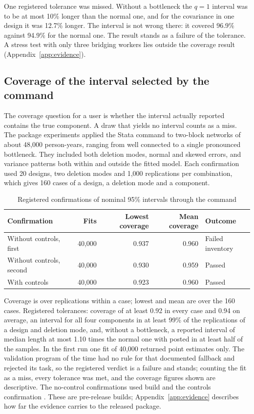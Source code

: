 One registered tolerance was missed. Without a bottleneck the $q=1$ interval was to be
at most 10\% longer than the normal one, and for the covariance in one design it was
12.7\% longer. The interval is not wrong there: it covered 96.9\% against 94.9\% for
the normal one. The result stands as a failure of the tolerance. A stress test with
only three bridging workers lies outside the coverage result
(Appendix~\ref{app:evidence}).

\subsection{Coverage of the interval selected by the command}\label{sec:impl-mc}
The coverage question for a user is whether the interval actually reported
contains the true component. A draw that yields no interval counts as a miss.
The package experiments applied the Stata command to two-block networks of
about 48,000 person-years, ranging from well connected to a single pronounced
bottleneck. They included both deletion modes, normal and skewed errors, and
variance patterns both within and outside the fitted model. Each confirmation
used 20 designs, two deletion modes and 1,000 replications per combination, which
gives 160 cases of a design, a deletion mode and a component.

\begin{table}[htbp]\centering
\caption{Registered confirmations of nominal 95\% intervals through the command}
\label{tab:impl-mc}
\begin{tabular}{@{}lrrrl@{}}
\toprule
Confirmation & Fits & Lowest coverage & Mean coverage & Outcome\\
\midrule
Without controls, first & 40,000 & 0.937 & 0.960 & Failed inventory\\
Without controls, second & 40,000 & 0.930 & 0.959 & Passed\\
With controls & 40,000 & 0.923 & 0.960 & Passed\\
\bottomrule
\end{tabular}
\par\smallskip\begin{minipage}{0.92\linewidth}\footnotesize
Coverage is over replications within a case; lowest and mean are over the 160 cases.
Registered tolerances: coverage of at least 0.92 in every case and 0.94 on average,
an interval for all four components in at least 99\% of the replications of a design
and deletion mode, and, without a bottleneck, a reported interval of median length at
most 1.10 times the normal one with  posted in at least half of the
samples. In the first run one fit of 40,000 returned point estimates only. The
validation program of the time had no rule for that documented fallback and rejected
its task, so the registered verdict is a failure and stands; counting the fit as a
miss, every tolerance was met, and the coverage figures shown are descriptive. The
no-control confirmations used build  and the controls confirmation
. These are pre-release builds; Appendix~\ref{app:evidence} describes
how far the evidence carries to the released package.
\end{minipage}
\end{table}

